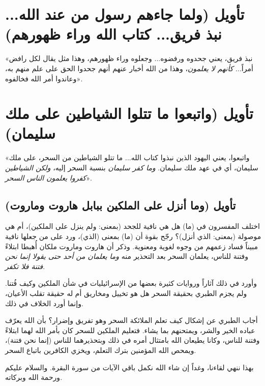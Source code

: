 \separator

\section{تأويل (ولما جاءهم رسول من عند الله... نبذ فريق... كتاب الله وراء ظهورهم)}
 «نبذ فريق، يعني جحدوه ورفضوه... وجعلوه وراء ظهورهم، وهذا مثل يقال لكل رافض أمراً... \textit{كأنهم لا يعلمون}، وهذا من الله أخبار عنهم أنهم جحدوا الحق على علم منهم به، وعاندوا أمر الله فخالفوه».

\separator

\section{تأويل (واتبعوا ما تتلوا الشياطين على ملك سليمان)}
 «واتبعوا، يعني اليهود الذين نبذوا كتاب الله... ما تتلو الشياطين من السحر، على ملك سليمان، أي في عهد ملك سليمان. \textit{وما كفر سليمان} بنسبة السحر إليه، \textit{ولكن الشياطين كفروا يعلمون الناس السحر}».

\subsection{تأويل (وما أنزل على الملكين ببابل هاروت وماروت)}
اختلف المفسرون في (ما) هل هي نافية للجحد (بمعنى: ولم ينزل على الملكين)، أم هي موصولة (بمعنى: الذي أنزل)؟
رجّح  بقوة أن (ما) بمعنى (الذي)، ورد على من جعلها نافية مبيناً فساد زعمهم من وجوه لغوية ومعنوية. وذكر أن هاروت وماروت ملكان أُهبطا ابتلاءً وفتنة للناس، يعلمان السحر بعد التحذير منه \textit{وما يعلمان من أحد حتى يقولا إنما نحن فتنة فلا تكفر}.

وأورد  في ذلك آثاراً وروايات كثيرة بعضها من الإسرائيليات في شأن الملكين وكيف فُتنا. ولم يجزم الطبري بحقيقة السحر هل هو تخييل ومخاريق أم له حقيقة تقلب الأعيان، وإنما أورد الخلاف في ذلك.

\begin{fawaid}
أجاب الطبري عن إشكال كيف تعلم الملائكة السحر وهو تفريق وإضرار؟ بأن الله يعرّف عباده الخير والشر، ويمتحنهم بما يشاء. فتعليم الملكين للسحر كان بأمر الله لهما ابتلاءً وفتنة للناس، وكانا يطيعان الله بامتثال أمره في ذلك وبتحذيرهما للناس (إنما نحن فتنة)، ويمحص الله المؤمنين بترك التعلم، ويخزي الكافرين باتباع السحر.
\end{fawaid}

\separator

بهذا ننهي لقاءنا، وغداً إن شاء الله نكمل باقي الآيات من سورة البقرة. والسلام عليكم ورحمة الله وبركاته.
